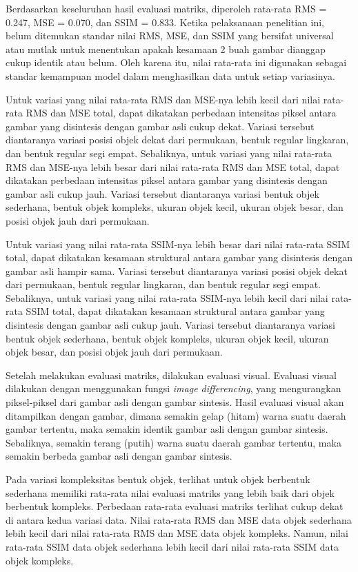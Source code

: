 \documentclass[conference]{IEEEtran}
\begin{document}
Berdasarkan keseluruhan hasil evaluasi matriks, diperoleh rata-rata RMS = 0.247, MSE = 0.070, dan SSIM = 0.833. 
Ketika pelaksanaan penelitian ini, belum ditemukan standar nilai RMS, MSE, dan SSIM yang bersifat universal atau mutlak untuk menentukan apakah kesamaan 2 buah gambar dianggap cukup identik atau belum. 
Oleh karena itu, nilai rata-rata ini digunakan sebagai standar kemampuan model dalam menghasilkan data untuk setiap variasinya.

Untuk variasi yang nilai rata-rata RMS dan MSE-nya lebih kecil dari nilai rata-rata RMS dan MSE total, dapat dikatakan perbedaan intensitas piksel antara gambar yang disintesis dengan gambar asli cukup dekat. 
Variasi tersebut diantaranya variasi posisi objek dekat dari permukaan, bentuk regular lingkaran, dan bentuk regular segi empat. 
Sebaliknya, untuk variasi yang nilai rata-rata RMS dan MSE-nya lebih besar dari nilai rata-rata RMS dan MSE total, dapat dikatakan perbedaan intensitas piksel antara gambar yang disintesis dengan gambar asli cukup jauh. 
Variasi tersebut diantaranya variasi bentuk objek sederhana, bentuk objek kompleks, ukuran objek kecil, ukuran objek besar, dan posisi objek jauh dari permukaan.

Untuk variasi yang nilai rata-rata SSIM-nya lebih besar dari nilai rata-rata SSIM total, dapat dikatakan kesamaan struktural antara gambar yang disintesis dengan gambar asli hampir sama. 
Variasi tersebut diantaranya variasi posisi objek dekat dari permukaan, bentuk regular lingkaran, dan bentuk regular segi empat. 
Sebaliknya, untuk variasi yang nilai rata-rata SSIM-nya lebih kecil dari nilai rata-rata SSIM total, dapat dikatakan kesamaan struktural antara gambar yang disintesis dengan gambar asli cukup jauh. 
Variasi tersebut diantaranya variasi bentuk objek sederhana, bentuk objek kompleks, ukuran objek kecil, ukuran objek besar, dan posisi objek jauh dari permukaan.

Setelah melakukan evaluasi matriks, dilakukan evaluasi visual. 
Evaluasi visual dilakukan dengan menggunakan fungsi \emph{image differencing}, yang mengurangkan piksel-piksel dari gambar asli dengan gambar sintesis. 
Hasil evaluasi visual akan ditampilkan dengan gambar, dimana semakin gelap (hitam) warna suatu daerah gambar tertentu, maka semakin identik gambar asli dengan gambar sintesis. 
Sebaliknya, semakin terang (putih) warna suatu daerah gambar tertentu, maka semakin berbeda gambar asli dengan gambar sintesis.

Pada variasi kompleksitas bentuk objek, terlihat untuk objek berbentuk sederhana memiliki rata-rata nilai evaluasi matriks yang lebih baik dari objek berbentuk kompleks. 
Perbedaan rata-rata evaluasi matriks terlihat cukup dekat di antara kedua variasi data.  
Nilai rata-rata RMS dan MSE data objek sederhana lebih kecil dari nilai rata-rata RMS dan MSE data objek kompleks. 
Namun, nilai rata-rata SSIM data objek sederhana lebih kecil dari nilai rata-rata SSIM data objek kompleks. 
\end{document}
